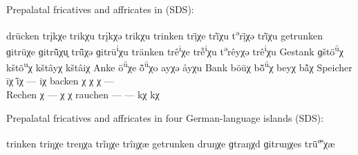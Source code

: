 {
\ea%
\label{ex:15:30}Prepalatal fricatives and affricates in  (SDS):
\begin{xlist}
\sn[]
\tab \tab  {} \tab {} \tab {} \tab  {}
\ex\label{ex:15:30a} drücken \tab trįkχ{\textquotesingle}e \tab trikχ{\textquotesingle}u \tab trįk{\textquotesingle}χ{\textquotedbl}ə \tab trikχ{\textquotesingle}u
\ex\label{ex:15:30b} trinken \tab trị̄χ{\textquotedbl}e \tab tr\~{ī}χ{\textquotesingle}u \tab t\textsuperscript{ə}rị̄χ{\textquotesingle}ə \tab  tr\~{ī}χ{\textquotesingle}u
\ex\label{ex:15:30c} getrunken \tab ɡitrüχ{\textquotedbl}e \tab ɡitr\~{ü}χ{\textquotesingle}u͈ \tab tr\~{ü}χ{\textquotesingle}ə \tab  ɡitrū\textsuperscript{i}χ{\textquotedbl}u
\ex\label{ex:15:30d} tränken \tab trê\textsuperscript{i}χ{\textquotedbl}e \tab tr\~{ê}\textsuperscript{i}χ{\textquotesingle}u \tab t\textsuperscript{ə}rêyχ{\textquotesingle}ə \tab  trê\textsuperscript{i}χ{\textquotesingle}u
\ex\label{ex:15:30e} Gestank \tab ɡštö\textsuperscript{ü}χ{\textquotedbl} \tab kštõ\textsuperscript{u}χ{\textquotedbl} \tab kštâyχ \tab kštâiχ{\textquotedbl}
\ex\label{ex:15:30f} Anke \tab ö\textsuperscript{ü}χ{\textquotedbl}e \tab \~{ö}\textsuperscript{ü}χ{\textquotesingle}o \tab ayχ{\textquotesingle}ə \tab åyχ{\textquotesingle}u
\ex\label{ex:15:30g} Bank \tab böüχ{\textquotedbl} \tab b\~{ö}\textsuperscript{ü}χ{\textquotesingle} \tab beyχ{\textquotesingle} \tab b\~{å}χ{\textquotedbl}
\ex\label{ex:15:30h} Speicher \tab īχ{\textquotedbl}  \tab  \~{ī}χ{\textquotedbl}  \tab  --- \tab iχ{\textquotesingle}
\ex\label{ex:15:30i} backen \tab χ{\textquotesingle}  \tab  χ{\textquotesingle}  \tab  χ{\textquotesingle}  \tab  ---\\
    Rechen \tab χ{\textquotedbl}  \tab  --- \tab χ{\textquotedbl}  \tab  χ{\textquotedbl}
\ex\label{ex:15:30j} rauchen \tab --- \tab --- \tab kχ{\textquotesingle} \tab kχ{\textquotedbl}
\end{xlist}
\ex%
\label{ex:15:31}
Prepalatal fricatives and affricates in four German-language islands (SDS):
\begin{xlist}
\sn[]
\tab \tab {} \tab {} \tab {} \tab {}
\ex\label{ex:15:31a} trinken \tab triŋχ{\textquotedbl}e \tab treŋχ{\textquotedbl}a \tab trĩŋχ{\textquotedbl}e  \tab  trîŋχ{\textquotesingle}æ
\ex\label{ex:15:31b} getrunken \tab druŋχ{\textquotedbl}e \tab ɡtraŋχ{\textquotedbl}d \tab ɡitruŋχ{\textquotedbl}es \tab tr\={ü}\textsuperscript{æ}χ{\textquotesingle}æ

\end{xlist}}
